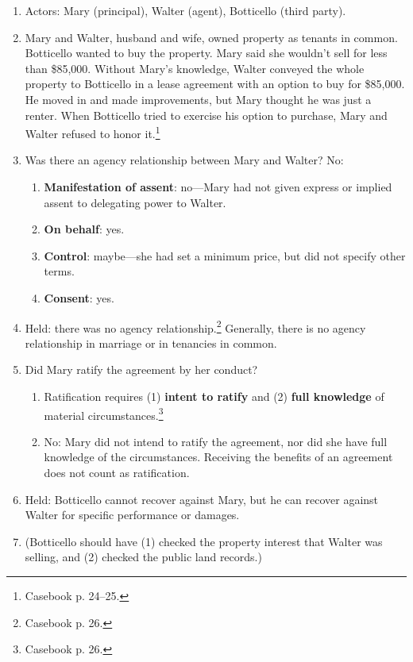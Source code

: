\begin{enumerate}
    \item Actors: Mary (principal), Walter (agent), Botticello (third party).
    \item Mary and Walter, husband and wife, owned property as tenants in 
    common. Botticello wanted to buy the property. Mary said she wouldn't sell 
    for less than \$85,000. Without Mary's knowledge, Walter conveyed the 
    whole property to Botticello in a lease agreement with an option to buy 
    for \$85,000. He moved in and made improvements, but Mary thought he was 
    just a renter. When Botticello tried to exercise his option to purchase, 
    Mary and Walter refused to honor it.\footnote{Casebook p. 24--25.}
    \item Was there an agency relationship between Mary and Walter? No:
    \begin{enumerate}
        \item \textbf{Manifestation of assent}: no---Mary had not given 
        express or implied assent to delegating power to Walter.
        \item \textbf{On behalf}: yes.
        \item \textbf{Control}: maybe---she had set a minimum price, but did 
        not specify other terms.
        \item \textbf{Consent}: yes.
    \end{enumerate}
    \item Held: there was no agency relationship.\footnote{Casebook p. 26.} 
    Generally, there is no agency relationship in marriage or in tenancies in 
    common.
    \item Did Mary ratify the agreement by her conduct?
    \begin{enumerate}
        \item Ratification requires (1) \textbf{intent to ratify} and (2) 
        \textbf{full knowledge} of material circumstances.\footnote{Casebook 
        p. 26.}
        \item No: Mary did not intend to ratify the agreement, nor did she 
        have full knowledge of the circumstances. Receiving the benefits of an 
        agreement does not count as ratification.
    \end{enumerate}
    \item Held: Botticello cannot recover against Mary, but he can recover 
    against Walter for specific performance or damages.
    \item (Botticello should have (1) checked the property interest that 
    Walter was selling, and (2) checked the public land records.)
\end{enumerate}

